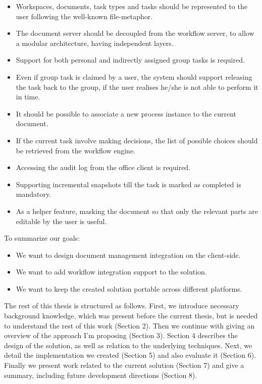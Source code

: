 \begin{itemize}
\item Workspaces, documents, task types and tasks should be represented to the
user following the well-known file-metaphor.
\item The document server should be decoupled from the workflow server, to
allow a modular architecture, having independent layers.
\item Support for both personal and indirectly assigned group tasks is required.
\item Even if group task is claimed by a user, the system should support
releasing the task back to the group, if the user realises he/she is not able to
perform it in time.
\item It should be possible to associate a new process instance to the current
document.
\item If the current task involve making decisions, the list of possible
choices should be retrieved from the workflow engine.
\item Accessing the audit log from the office client is required.
\item Supporting incremental snapshots till the task is marked as completed is
mandatory.
\item As a helper feature, masking the document so that only the relevant parts
are editable by the user is useful.
\end{itemize}

To summarize our goals:

\begin{itemize}
\item We want to design document management integration on the client-side.
\item We want to add workflow integration support to the solution.
\item We want to keep the created solution portable across different platforms.
\end{itemize}

The rest of this thesis is structured as follows. First, we introduce necessary
background knowledge, which was present before the current thesis, but is
needed to understand the rest of this work (Section 2). Then we continue with
giving an overview of the approach I'm proposing (Section 3). Section 4
describes the design of the solution, as well as relation to the underlying
techniques. Next, we detail the implementation we created (Section 5) and also
evaluate it (Section 6). Finally we present work related to the current
solution (Section 7) and give a summary, including future development
directions (Section 8).

